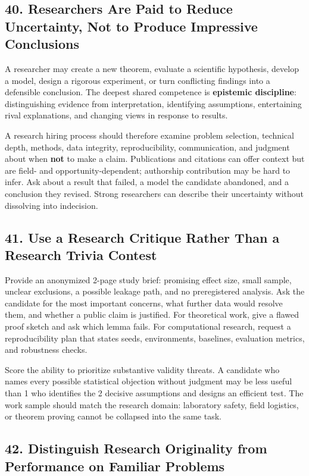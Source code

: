 \subsection*{40. Researchers Are Paid to Reduce Uncertainty, Not to Produce Impressive Conclusions}

A researcher may create a new theorem, evaluate a scientific hypothesis, develop a model, design a rigorous experiment, or turn conflicting findings into a defensible conclusion. The deepest shared competence is \textbf{epistemic discipline}: distinguishing evidence from interpretation, identifying assumptions, entertaining rival explanations, and changing views in response to results.

A research hiring process should therefore examine problem selection, technical depth, methods, data integrity, reproducibility, communication, and judgment about when \textbf{not} to make a claim. Publications and citations can offer context but are field- and opportunity-dependent; authorship contribution may be hard to infer. Ask about a result that failed, a model the candidate abandoned, and a conclusion they revised. Strong researchers can describe their uncertainty without dissolving into indecision.

\subsection*{41. Use a Research Critique Rather Than a Research Trivia Contest}

Provide an anonymized 2-page study brief: promising effect size, small sample, unclear exclusions, a possible leakage path, and no preregistered analysis. Ask the candidate for the most important concerns, what further data would resolve them, and whether a public claim is justified. For theoretical work, give a flawed proof sketch and ask which lemma fails. For computational research, request a reproducibility plan that states seeds, environments, baselines, evaluation metrics, and robustness checks.

Score the ability to prioritize substantive validity threats. A candidate who names every possible statistical objection without judgment may be less useful than 1 who identifies the 2 decisive assumptions and designs an efficient test. The work sample should match the research domain: laboratory safety, field logistics, or theorem proving cannot be collapsed into the same task.

\subsection*{42. Distinguish Research Originality from Performance on Familiar Problems}

